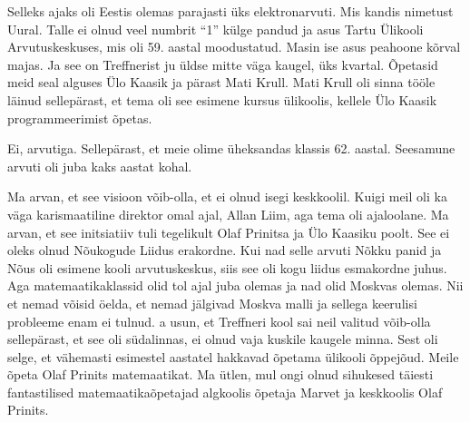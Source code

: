 
Selleks ajaks oli Eestis olemas parajasti üks elektronarvuti. Mis kandis nimetust Uural. Talle ei olnud veel numbrit \enquote{1} külge pandud ja asus Tartu Ülikooli Arvutuskeskuses, mis oli 59. aastal moodustatud. Masin ise asus peahoone kõrval majas. Ja see on Treffnerist ju üldse mitte väga kaugel, üks kvartal. Õpetasid meid seal alguses Ülo Kaasik ja pärast Mati Krull. Mati Krull oli sinna tööle läinud sellepärast, et tema oli see esimene kursus ülikoolis, kellele Ülo Kaasik programmeerimist õpetas. 


Ei, arvutiga. Sellepärast, et meie olime üheksandas klassis 62. aastal. Seesamune arvuti oli juba kaks aastat kohal. 


Ma arvan, et see visioon võib-olla, et ei olnud isegi keskkoolil. Kuigi meil oli ka väga karismaatiline direktor omal ajal, Allan Liim, aga tema oli ajaloolane. Ma arvan, et see initsiatiiv tuli tegelikult Olaf Prinitsa ja Ülo Kaasiku poolt. See ei oleks olnud Nõukogude Liidus erakordne. Kui nad selle arvuti Nõkku panid ja Nõus oli esimene kooli arvutuskeskus, siis see oli kogu liidus esmakordne juhus. Aga matemaatikaklassid olid tol ajal juba olemas ja nad olid Moskvas olemas. Nii et nemad võisid öelda, et nemad jälgivad Moskva malli ja sellega keerulisi probleeme enam ei tulnud. a usun, et Treffneri kool sai neil valitud võib-olla sellepärast, et see oli südalinnas, ei olnud vaja kuskile kaugele minna. Sest oli selge, et vähemasti esimestel aastatel hakkavad õpetama ülikooli õppejõud. Meile õpeta Olaf Prinits matemaatikat. Ma ütlen, mul ongi olnud sihukesed täiesti fantastilised matemaatikaõpetajad algkoolis õpetaja Marvet ja keskkoolis Olaf Prinits. 


